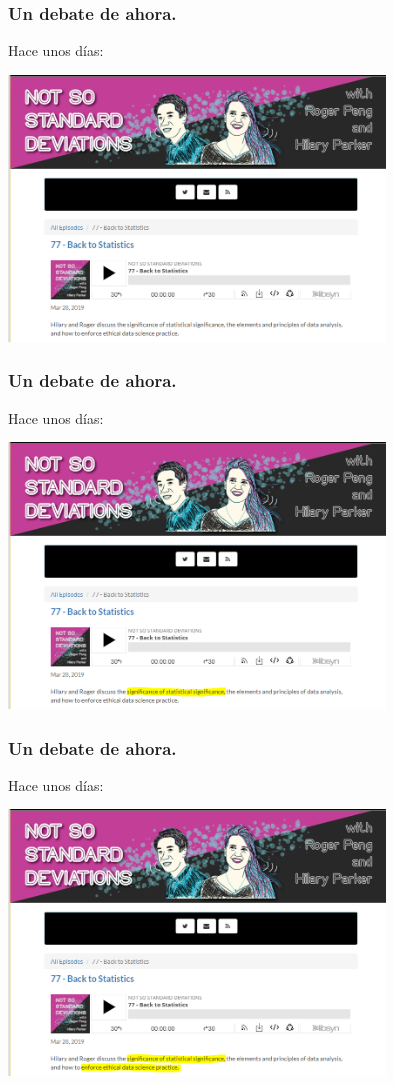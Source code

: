 \documentclass[9pt]{beamer}
\begin{document}
\begin{frame}
  \frametitle{Un debate de ahora.}
  Hace unos días:\\ 
  \begin{center}
  \includegraphics[width=10cm]{images/nssd_1}
  \end{center}
\end{frame}


\begin{frame}
  \frametitle{Un debate de ahora.}
  Hace unos días:\\ 
  \begin{center}
  \includegraphics[width=10cm]{images/nssd_2}
  \end{center}
\end{frame}


\begin{frame}
  \frametitle{Un debate de ahora.}
  Hace unos días:\\ 
  \begin{center}
  \includegraphics[width=10cm]{images/nssd_3}
  \end{center}
\end{frame}
\end{document}
